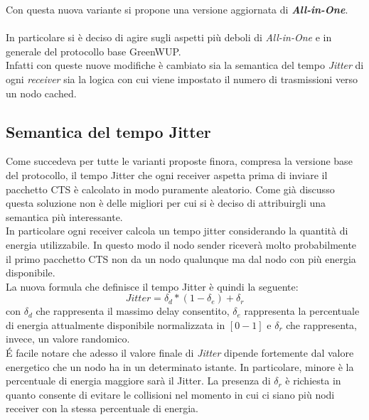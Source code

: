 Con questa nuova variante si propone una versione aggiornata di \textbf{\textit{All-in-One}}.\\
\\
In particolare si è deciso di agire sugli aspetti più deboli di \textit{All-in-One} e in generale del protocollo base GreenWUP.\\
Infatti con queste nuove modifiche è cambiato sia la semantica del tempo \textit{Jitter} di ogni \textit{receiver} sia la logica con cui viene impostato il numero di trasmissioni verso un nodo cached.

\subsection{Semantica del tempo Jitter}
Come succedeva per tutte le varianti proposte finora, compresa la versione base del protocollo, il tempo Jitter che ogni receiver aspetta prima di inviare il pacchetto CTS è calcolato in modo puramente aleatorio. Come già discusso questa soluzione non è delle migliori per cui si è deciso di attribuirgli una semantica più interessante.\\
In particolare ogni receiver calcola un tempo jitter considerando la quantità di energia utilizzabile. In questo modo il nodo sender riceverà molto probabilmente il primo pacchetto CTS non da un nodo qualunque ma dal nodo con più energia disponibile.\\
La nuova formula che definisce il tempo Jitter è quindi la seguente:
\[Jitter = \delta_{d} * (1-\delta_e) + \delta_r\]
con \(\delta_{d}\) che rappresenta il massimo delay consentito, \(\delta_{e}\) rappresenta la percentuale di energia attualmente disponibile normalizzata in \([0-1]\) e \(\delta_{r}\) che rappresenta, invece, un valore randomico.\\

\'E facile notare che adesso il valore finale di \textit{Jitter} dipende fortemente dal valore energetico che un nodo ha in un determinato istante. In particolare, minore è la percentuale di energia maggiore sarà il Jitter. La presenza di \(\delta_{r}\) è richiesta in quanto consente di evitare le collisioni nel momento in cui ci siano più nodi receiver con la stessa percentuale di energia.

